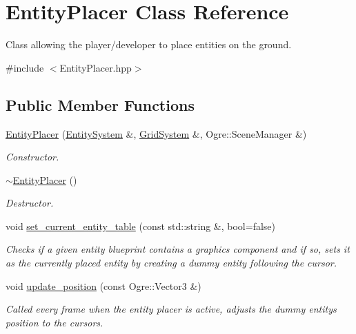 \hypertarget{class_entity_placer}{}\section{Entity\+Placer Class Reference}
\label{class_entity_placer}


Class allowing the player/developer to place entities on the ground.  




{\ttfamily \#include $<$Entity\+Placer.\+hpp$>$}

\subsection*{Public Member Functions}
\begin{DoxyCompactItemize}
\item 
\hyperlink{class_entity_placer_ab2ee072da3a1584b8ffbe6f1d299dcc7}{Entity\+Placer} (\hyperlink{class_entity_system}{Entity\+System} \&, \hyperlink{class_grid_system}{Grid\+System} \&, Ogre\+::\+Scene\+Manager \&)
\begin{DoxyCompactList}\small\item\em Constructor. \end{DoxyCompactList}\item 
\hyperlink{class_entity_placer_aa95644c347070f209bc01dc2f2391851}{$\sim$\+Entity\+Placer} ()
\begin{DoxyCompactList}\small\item\em Destructor. \end{DoxyCompactList}\item 
void \hyperlink{class_entity_placer_af8870b8ce74e91a02f7675a3c8a2a692}{set\+\_\+current\+\_\+entity\+\_\+table} (const std\+::string \&, bool=false)
\begin{DoxyCompactList}\small\item\em Checks if a given entity blueprint contains a graphics component and if so, sets it as the currently placed entity by creating a dummy entity following the cursor. \end{DoxyCompactList}\item 
void \hyperlink{class_entity_placer_a0314d1d228bff8b317b89481aa92c361}{update\+\_\+position} (const Ogre\+::\+Vector3 \&)
\begin{DoxyCompactList}\small\item\em Called every frame when the entity placer is active, adjusts the dummy entity\textquotesingle{}s position to the cursor\textquotesingle{}s. \end{DoxyCompactList}\item 

\end{DoxyCompactItemize}
